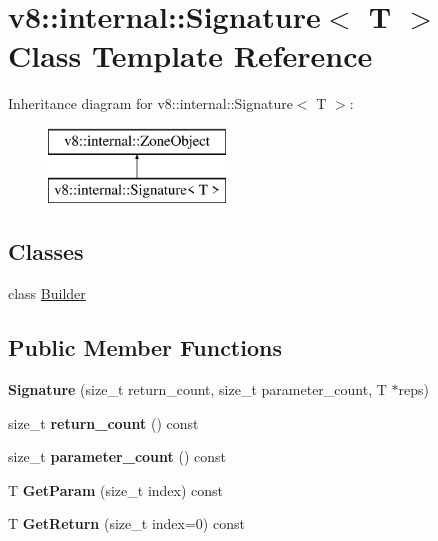 \hypertarget{classv8_1_1internal_1_1_signature}{}\section{v8\+:\+:internal\+:\+:Signature$<$ T $>$ Class Template Reference}
\label{classv8_1_1internal_1_1_signature}
Inheritance diagram for v8\+:\+:internal\+:\+:Signature$<$ T $>$\+:\begin{figure}[H]
\begin{center}
\leavevmode
\includegraphics[height=2.000000cm]{classv8_1_1internal_1_1_signature}
\end{center}
\end{figure}
\subsection*{Classes}
\begin{DoxyCompactItemize}
\item 
class \hyperlink{classv8_1_1internal_1_1_signature_1_1_builder}{Builder}
\end{DoxyCompactItemize}
\subsection*{Public Member Functions}
\begin{DoxyCompactItemize}
\item 
{\bfseries Signature} (size\+\_\+t return\+\_\+count, size\+\_\+t parameter\+\_\+count, T $\ast$reps)\hypertarget{classv8_1_1internal_1_1_signature_a44b2643dd82326d0716194c50a2ebd9e}{}\label{classv8_1_1internal_1_1_signature_a44b2643dd82326d0716194c50a2ebd9e}

\item 
size\+\_\+t {\bfseries return\+\_\+count} () const \hypertarget{classv8_1_1internal_1_1_signature_af69d92cedfe291c108d41609776bd4b2}{}\label{classv8_1_1internal_1_1_signature_af69d92cedfe291c108d41609776bd4b2}

\item 
size\+\_\+t {\bfseries parameter\+\_\+count} () const \hypertarget{classv8_1_1internal_1_1_signature_aef000f1f56ee5a5742ebe0c948a2aa03}{}\label{classv8_1_1internal_1_1_signature_aef000f1f56ee5a5742ebe0c948a2aa03}

\item 
T {\bfseries Get\+Param} (size\+\_\+t index) const \hypertarget{classv8_1_1internal_1_1_signature_a2cde447f60985ccf6c2af3b809f8adb8}{}\label{classv8_1_1internal_1_1_signature_a2cde447f60985ccf6c2af3b809f8adb8}

\item 
T {\bfseries Get\+Return} (size\+\_\+t index=0) const \hypertarget{classv8_1_1internal_1_1_signature_a69ffb22f38b385e1f593b81973067c03}{}\label{classv8_1_1internal_1_1_signature_a69ffb22f38b385e1f593b81973067c03}

\end{DoxyCompactItemize}
